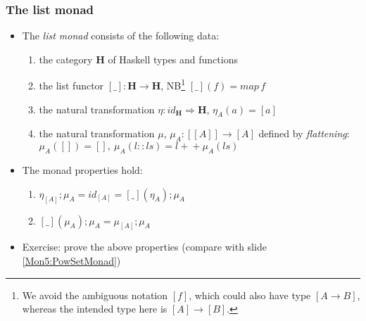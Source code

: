 \documentclass[handout]{beamer}
\newcommand{\To}{\Rightarrow}
\newcommand{\bfsf}[1]{{\boldsymbol{#1}}}
\newcommand{\HH}{\bfsf{H}}
\begin{document}
\frame
  {   
    \frametitle{The list monad}\label{Mon5:ListMonad}

 \begin{itemize}[<+->]
\item The \emph{list monad} consists of the following data:
 \begin{enumerate}
    \item the category $\HH$ of Haskell types and functions
    \item the list functor $[\_]:\HH\to\HH$, NB\footnote%
{We avoid the ambiguous notation $[f]$, which could also have type $[A\to B]$,
whereas the intended type here is $[A]\to [B]$.}
 $[\_](f)  =  map\, f$
    \item the natural transformation $\eta: id_\HH \To \HH$, $\eta_A(a)= [a]$
    \item the natural transformation $\mu$, 
$\mu_A: [[A]] \to [A] $ defined by \emph{flattening}:
$\mu_A([]) = [],~\mu_A(l::ls) = l{+}\!{+}\mu_A(ls)$
 \end{enumerate}
\item The monad properties hold:
 \begin{enumerate}
    \item $\eta_{[A]};\mu_A = id_{[A]} = [\_](\eta_A);\mu_A$
    \item $[\_](\mu_A);\mu_A = \mu_{[A]};\mu_A$
 \end{enumerate}
\item Exercise: prove the above properties (compare with slide \ref{Mon5:PowSetMonad})
 \end{itemize}

 }
\end{document}
